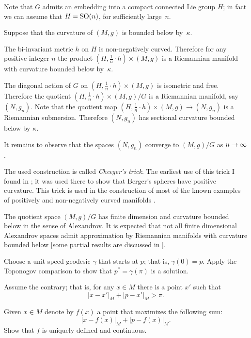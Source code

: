 \medskip

Note that $G$ admits an embedding into a compact connected Lie group $H$;
in fact we can assume that $H=\mathrm{SO}(n)$, for sufficiently large~$n$.

Suppose that the curvature of $(M,g)$ is bounded below by~$\kappa$.

The bi-invariant metric $h$ on $H$ is non-negatively curved.
Therefore for any positive integer $n$ the product $(H,\tfrac1n\cdot h)\times (M,g)$ is a Riemannian manifold with  curvature bounded below by~$\kappa$.

The diagonal action of $G$ on $(H,\tfrac1n\cdot h)\times (M,g)$ is isometric and free. 
Therefore 
the quotient $(H,\tfrac1n\cdot h)\times (M,g)/G$
is a Riemannian manifold, say $(N,g_n)$.
Note that the quotient map $(H,\tfrac1n\cdot h)\times (M,g)\to (N,g_n)$ is a Riemannian submersion.
Therefore $(N,g_n)$ has sectional curvature bounded below by $\kappa$.

It remains to observe that the spaces $(N,g_n)$ converge to $(M,g)/G$ as $n\z\to \infty$.\qeds

The used construction is called \emph{Cheeger's trick}.
The earliest use of this trick I found in \cite{GKM}; 
it was used there to show that Berger's spheres have positive curvature.
This trick is used in the construction of most of the known examples of positively and non-negatively curved manifolds
 \cite{cheeger,aloff-wallach,gromoll-meyer,eschenburg-spaces,bazajkin}.
 
The quotient space  $(M,g)/G$ has finite dimension and curvature bounded below in the sense of Alexandrov. 
It is expected that not all finite dimensional Alexandrov spaces admit approximation by Riemannian manifolds with curvature bounded below
[some partial results are discussed in ].








Choose a unit-speed geodesic $\gamma$ that starts at $p$;
that is, $\gamma(0)=p$.
Apply the Toponogov comparison to show that $p^*=\gamma(\pi)$ is a solution. 
\qeds

Assume the contrary;
that is, for any $x\in M$ there is a point $x'$ such that 
\[|x-x'|_M+|p-x'|_M>\pi.\]

Given $x\in M$ denote by $f(x)$ a point that maximizes the following sum:
\[|x-f(x)|_M+|p-f(x)|_M.\]
Show that $f$ is uniquely defined and continuous.

